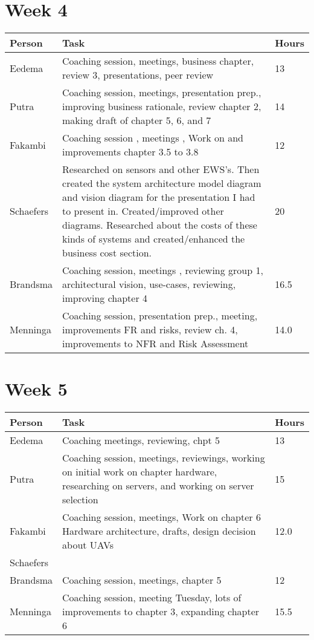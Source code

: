 \section{Week 4}
\begin{tabular}{p{} p{} p{}}
   \textbf{Person} & \textbf{Task} & \textbf{Hours} \\ \midrule
	Eedema & Coaching session, meetings, business chapter, review 3, presentations, peer review &13  \\ \midrule
	Putra & Coaching session, meetings, presentation prep., improving business rationale, review chapter 2, making draft of chapter 5, 6, and 7 & 14 \\ \midrule
	Fakambi & Coaching session , meetings , Work on and improvements chapter 3.5 to 3.8 & 12 \\ \midrule
	Schaefers & Researched on sensors and other EWS's. Then created the system architecture model diagram and vision diagram for the presentation I had to present in. Created/improved other diagrams. Researched about the costs of these kinds of systems and created/enhanced the business cost section. & 20 \\ \midrule
	Brandsma & Coaching session, meetings , reviewing group 1, architectural vision, use-cases, reviewing, improving chapter 4 & 16.5\\ \midrule
	Menninga & Coaching session, presentation prep., meeting, improvements FR and risks, review ch. 4, improvements to NFR and Risk Assessment & 14.0 \\ \midrule
\end{tabular}

\section{Week 5}
\begin{tabular}{p{} p{} p{}}
    \textbf{Person} & \textbf{Task} & \textbf{Hours} \\ \midrule
	Eedema & Coaching meetings, reviewing, chpt 5  & 13 \\ \midrule
	Putra & Coaching session, meetings, reviewings, working on initial work on chapter hardware, researching on servers, and working on server selection  & 15 \\ \midrule
	Fakambi & Coaching session, meetings, Work on chapter 6 Hardware architecture, drafts, design decision about UAVs & 12.0 \\ \midrule
	Schaefers &  & \\ \midrule
	Brandsma & Coaching session, meetings, chapter 5  & 12 \\ \midrule
	Menninga & Coaching session, meeting Tuesday, lots of improvements to chapter 3, expanding chapter 6 & 15.5 \\ \midrule
\end{tabular}

